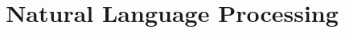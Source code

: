 \documentclass[theme=sleek, randomorder, hidesidemenu]{webquiz}
\title{Natural Language Processing}
\begin{document}
\begin{quizindex}
\end{quizindex}
\end{document}
